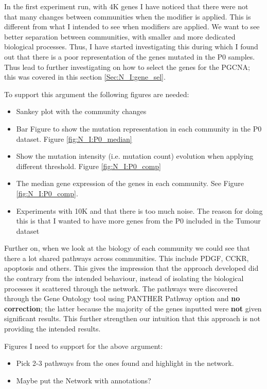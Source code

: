 \newpage

In the first experiment run, with 4K genes I have noticed that there were not that many changes between communities when the modifier is applied. This is different from what I intended to see when modifiers are applied. We want to see better separation between communities, with smaller and more dedicated biological processes. Thus, I have started investigating this during which I found out that there is a poor representation of the genes mutated in the P0 samples. Thus lead to further investigating on how to select the genes for the PGCNA; this was covered in this section \ref{Sec:N_I:gene_sel}.

To support this argument the following figures are needed:
\begin{itemize}
    \item Sankey plot with the community changes
    \item Bar Figure to show the mutation representation in each community in the P0 dataset. Figure \ref{fig:N_I:P0_median}
    \item Show the mutation intensity (i.e. mutation count) evolution when applying different threshold.  Figure \ref{fig:N_I:P0_comp}
    \item The median gene expression of the genes in each community. See Figure \ref{fig:N_I:P0_comp}.
    \item Experiments with 10K and that there is too much noise. The reason for doing this is that I wanted to have more genes from the P0 included in the Tumour dataset
\end{itemize}

Further on, when we look at the biology of each community we could see that there a lot shared pathways across communities. This include PDGF, CCKR, apoptosis and others. This gives the impression that the approach developed did the contrary from the intended behaviour, instead of isolating the biological processes it scattered through the network. The pathways were discovered through the Gene Ontology tool using PANTHER Pathway option and \textbf{no correction}; the latter because the majority of the genes inputted were \textbf{not} given significant results. This further strengthen our intuition that this approach is not providing the intended results.

Figures I need to support for the above argument:
\begin{itemize}
    \item Pick 2-3 pathways from the ones found and highlight in the network.
    \item Maybe put the Network with annotations?
\end{itemize}

